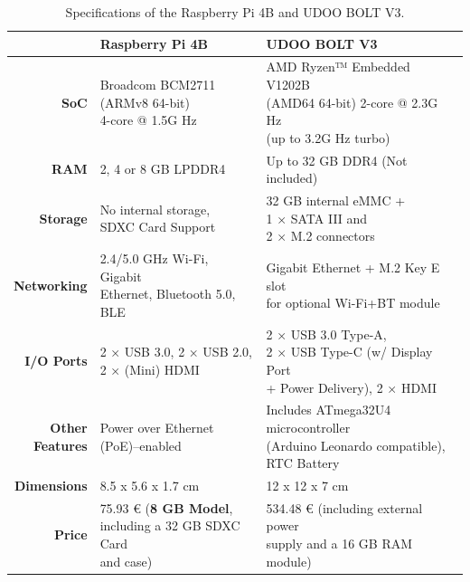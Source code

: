 \renewcommand{\arraystretch}{2.5}
\begin{table}[H]
    \centering
    \caption{Specifications of the Raspberry Pi 4B and UDOO BOLT V3.}
    \begin{adjustbox}{width=0.85\columnwidth,center}
    \begin{tabular}{r|l|l}
        & \textbf{Raspberry Pi 4B}& \textbf{UDOO BOLT V3}  \\ \hline
        \textbf{SoC} &  \makecell{Broadcom BCM2711 \\ (ARMv8 64-bit) \\ 4-core @ 1.5G Hz} & \makecell{AMD Ryzen™ Embedded V1202B \\ (AMD64 64-bit) 2-core @ 2.3G Hz \\ (up to 3.2G Hz turbo)}\\
        \textbf{\acs{RAM}} & 2, 4 or 8 GB LPDDR4 & Up to 32 GB DDR4 (Not included) \\ 
        \textbf{Storage} & \makecell{No internal storage, \\ SDXC Card Support} & \makecell{32 GB internal eMMC + \\1 × SATA III and \\ 2 × M.2 connectors}\\
        \textbf{Networking} & \makecell{2.4/5.0 GHz Wi-Fi, Gigabit \\ Ethernet, Bluetooth 5.0, BLE} & \makecell{Gigabit Ethernet + M.2 Key E slot \\ for optional Wi-Fi+BT module}\\ 
        \textbf{I/O Ports} & \makecell{ 2 × USB 3.0, 2 × USB 2.0, \\ 2 × (Mini) HDMI} & \makecell{2 × USB 3.0 Type-A, \\ 2 × USB Type-C (w/ Display Port \\ + Power Delivery), 2 × HDMI} \\
        \makecell[r]{\textbf{Other} \\\textbf{Features}} & \makecell{Power over Ethernet \\(PoE)–enabled} & \makecell{Includes ATmega32U4 microcontroller\\ (Arduino Leonardo compatible), \\ RTC Battery} \\   
        \textbf{Dimensions} & 8.5 x 5.6 x 1.7 cm & 12 x 12 x 7 cm \\
        \textbf{Price} & \makecell{75.93 € (\textbf{8 GB Model}, \\ including a 32 GB SDXC Card\\ and case)} & \makecell{534.48 € (including external power \\ supply and a 16 GB \acs{RAM} module)} \\
    \end{tabular}
    \end{adjustbox}
    \label{tab:comparsion-hardwareplatform}
\end{table}
\renewcommand{\arraystretch}{1}

